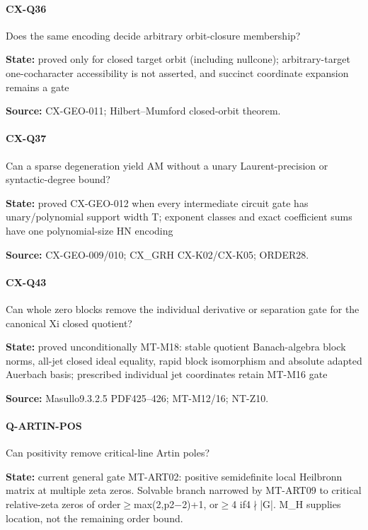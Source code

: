 \documentclass[11pt,a4paper]{article}
\begin{document}
\paragraph{CX-Q36} Does the same encoding decide arbitrary orbit-closure membership?

\textbf{State:} proved only for closed target orbit (including nullcone); arbitrary-target one-cocharacter accessibility is not asserted, and succinct coordinate expansion remains a gate

\textbf{Source:} CX-GEO-011; Hilbert–\allowbreak{}Mumford closed-orbit theorem.

\paragraph{CX-Q37} Can a sparse degeneration yield AM without a unary Laurent-precision or syntactic-degree bound?

\textbf{State:} proved CX-GEO-012 when every intermediate circuit gate has unary/\allowbreak{}polynomial support width T; exponent classes and exact coefficient sums have one polynomial-size HN encoding

\textbf{Source:} CX-GEO-009/\allowbreak{}010; CX\_\allowbreak{}GRH CX-K02/\allowbreak{}CX-K05; ORDER28.

\paragraph{CX-Q43} Can whole zero blocks remove the individual derivative or separation gate for the canonical Xi closed quotient?

\textbf{State:} proved unconditionally MT-M18:\allowbreak{} stable quotient Banach-algebra block norms, all-jet closed ideal equality, rapid block isomorphism and absolute adapted Auerbach basis; prescribed individual jet coordinates retain MT-M16 gate

\textbf{Source:} Masullo9.\allowbreak{}3.\allowbreak{}2.\allowbreak{}5 PDF425–\allowbreak{}426; MT-M12/\allowbreak{}16; NT-Z10.

\paragraph{Q-ARTIN-POS} Can positivity remove critical-line Artin poles?

\textbf{State:} current general gate MT-ART02:\allowbreak{} positive semidefinite local Heilbronn matrix at multiple zeta zeros.\allowbreak{} Solvable branch narrowed by MT-ART09 to critical relative-zeta zeros of order\ensuremath{\ge}max(2,p2\ensuremath{-}2)+1, or\ensuremath{\ge}4 if4\ensuremath{\nmid}|G|.\allowbreak{} M\_\allowbreak{}H supplies location, not the remaining order bound.\allowbreak{}
\end{document}
